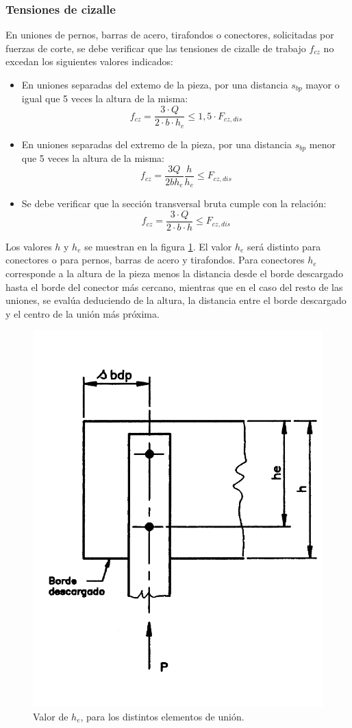 \subsubsection{Tensiones de cizalle}
En uniones de pernos, barras de acero, tirafondos o conectores, solicitadas por fuerzas de corte, se debe verificar que las tensiones de cizalle de trabajo $f_{cz}$ no excedan los siguientes valores indicados:
\begin{itemize}
	\item En uniones separadas del extemo de la pieza, por una distancia $s_{bp}$ mayor o igual que 5 veces la altura de la misma: 
	\begin{equation}
		f_{cz} = \frac{3\cdot Q}{2\cdot b\cdot h_e} \leq 1,5\cdot F_{cz,dis}  
	\end{equation}
	\item En uniones separadas del extremo de la pieza, por una distancia $s_{bp}$ menor que 5 veces la altura de la misma:
	\begin{equation}
		f_{cz} = \frac{3Q}{2 b h_e} \frac{h}{h_e} \leq F_{cz,dis}
	\end{equation}
	\item Se debe verificar que la sección transversal bruta cumple con la relación:
	\begin{equation}
		f_{cz} = \frac{3\cdot Q}{2\cdot b\cdot h} \leq F_{cz,dis}
	\end{equation}		
\end{itemize}

Los valores $h$ y $h_e$ se muestran en la figura \ref{fig:nch_19}. El valor $h_e$ será distinto para conectores o para pernos, barras de acero y tirafondos. Para conectores $h_e$ corresponde a la altura de la pieza menos la distancia desde el borde descargado hasta el borde del conector más cercano, mientras que en el caso del resto de las uniones, se evalúa deduciendo de la altura, la distancia entre el borde descargado y el centro de la unión más próxima.

\begin{figure}[H]
\centering
\includegraphics[width=0.45\linewidth]{Imagenes/figura_19.pdf}
\caption{Valor de $h_e$, para los distintos elementos de unión. \cite{nch1198}}
\label{fig:nch_19}
\end{figure}


